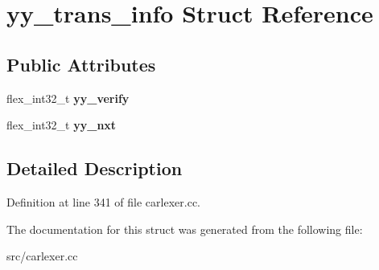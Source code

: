 \hypertarget{structyy__trans__info}{\section{yy\-\_\-trans\-\_\-info Struct Reference}
\label{structyy__trans__info}
}
\subsection*{Public Attributes}
\begin{DoxyCompactItemize}
\item 
\hypertarget{structyy__trans__info_a5c9f61e770deef50bd4e697310342fe9}{flex\-\_\-int32\-\_\-t {\bfseries yy\-\_\-verify}}\label{structyy__trans__info_a5c9f61e770deef50bd4e697310342fe9}

\item 
\hypertarget{structyy__trans__info_ae0715250c2bef261e596e77e0030f13e}{flex\-\_\-int32\-\_\-t {\bfseries yy\-\_\-nxt}}\label{structyy__trans__info_ae0715250c2bef261e596e77e0030f13e}

\end{DoxyCompactItemize}


\subsection{Detailed Description}


Definition at line 341 of file carlexer.\-cc.



The documentation for this struct was generated from the following file\-:\begin{DoxyCompactItemize}
\item 
src/carlexer.\-cc\end{DoxyCompactItemize}
